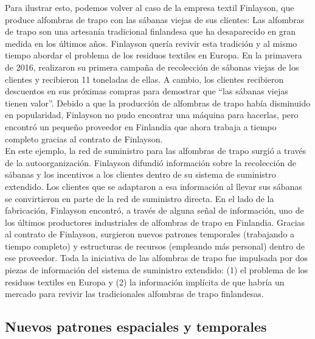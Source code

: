 \documentclass[runningheads]{llncs}
\begin{document}
Para ilustrar esto, podemos volver al caso de la empresa textil
Finlayson, que produce alfombras de trapo con las sábanas viejas de sus
clientes: Las alfombras de trapo son una artesanía tradicional
finlandesa que ha desaparecido en gran medida en los últimos años.
Finlayson quería revivir esta tradición y al mismo tiempo abordar el
problema de los residuos textiles en Europa. En la primavera de 2016,
realizaron su primera campaña de recolección de sábanas viejas de los
clientes y recibieron 11 toneladas de ellas. A cambio, los clientes
recibieron descuentos en sus próximas compras para demostrar que ``las
sábanas viejas tienen valor''. Debido a que la producción de alfombras
de trapo había disminuido en popularidad, Finlayson no pudo encontrar
una máquina para hacerlas, pero encontró un pequeño proveedor en
Finlandia que ahora trabaja a tiempo completo gracias al contrato de
Finlayson.\\

En este ejemplo, la red de suministro para las alfombras de trapo surgió
a través de la autoorganización. Finlayson difundió información sobre la
recolección de sábanas y los incentivos a los clientes dentro de su
sistema de suministro extendido. Los clientes que se adaptaron a esa
información al llevar sus sábanas se convirtieron en parte de la red de
suministro directa. En el lado de la fabricación, Finlayson encontró, a
través de alguna señal de información, uno de los últimos productores
industriales de alfombras de trapo en Finlandia. Gracias al contrato de
Finlayson, surgieron nuevos patrones temporales (trabajando a tiempo
completo) y estructuras de recursos (empleando más personal) dentro de
ese proveedor. Toda la iniciativa de las alfombras de trapo fue
impulsada por dos piezas de información del sistema de suministro
extendido: (1) el problema de los residuos textiles en Europa y (2) la
información implícita de que habría un mercado para revivir las
tradicionales alfombras de trapo finlandesas.

\hypertarget{nuevos-patrones-espaciales-y-temporales}{%
\subsection{Nuevos patrones espaciales y
temporales}\label{nuevos-patrones-espaciales-y-temporales}}
\end{document}
